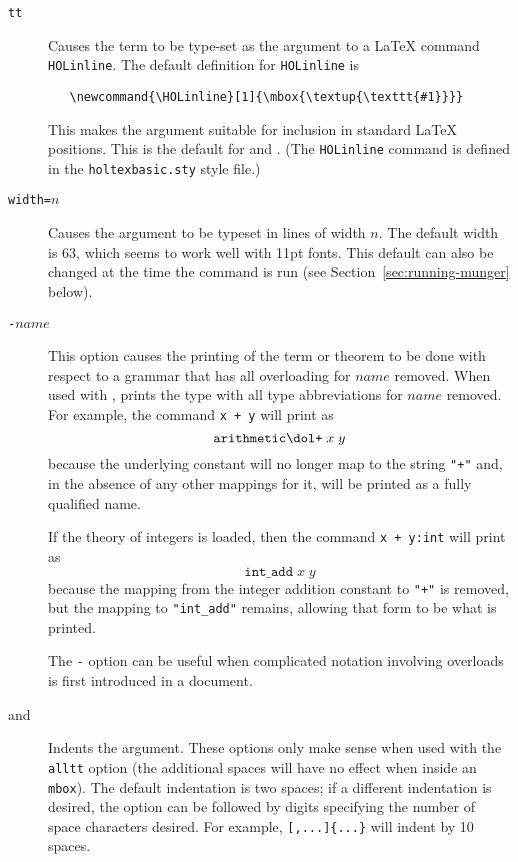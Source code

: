 \begin{description}
\item[\texttt{tt}] %
Causes the term to be type-set as the argument to a \LaTeX{} command \texttt{\bs{}HOLinline}.
%
The default definition for \texttt{\bs{}HOLinline} is
\begin{verbatim}
   \newcommand{\HOLinline}[1]{\mbox{\textup{\texttt{#1}}}}
\end{verbatim}
This makes the argument suitable for inclusion in standard \LaTeX{} positions.
%
This is the default for \holtm{} and \holty.
%
(The \texttt{\bs{}HOLinline} command is defined in the \texttt{holtexbasic.sty} style file.)

\item[\texttt{width=}$n$] Causes the argument to be typeset in lines of width $n$.
%
The default width is $63$, which seems to work well with 11pt fonts.
%
This default can also be changed at the time the \munge{} command is
run (see Section~\ref{sec:running-munger} below).

\item[\texttt{-}$\mathit{name}$]
%
This option causes the printing of the term or theorem to be done with respect to a grammar that has all overloading for $\mathit{name}$ removed.
When used with \holty, prints the type with all type abbreviations for $\mathit{name}$ removed.
For example, the command \texttt{\holtm[-+]\lb{}x + y\rb} will print as
\[
\texttt{arithmetic\dol+}\;x\;y
\]
because the underlying constant will no longer map to the string \texttt{"+"} and, in the absence of any other mappings for it, will be printed as a fully qualified name.

If the theory of integers is loaded, then the command \texttt{\holtm[-+]\lb{}x + y:int\rb} will print as \[
\texttt{int\_add}\;x\;y
\]
because the mapping from the integer addition constant to \texttt{"+"} is removed, but the mapping to \texttt{"int\_add"} remains, allowing that form to be what is printed.

The \texttt{-} option can be useful when complicated notation involving overloads is first introduced in a document.

\item[\texttt{\indentoption} and \texttt{\indentoption\td}] Indents the argument.
%
  These options only make sense when used with the \texttt{alltt} option (the additional spaces will have no effect when inside an \texttt{\bs{}mbox}).
%
  The default indentation is two spaces; if a different indentation is desired, the option can be followed by digits specifying the number of space characters desired.
%
  For example, \texttt{\holthm{}[,...]\{...\}} will indent by 10 spaces.


\end{description}
